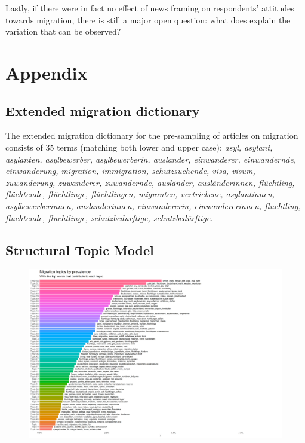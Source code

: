 \documentclass{article}
\begin{document}
Lastly, if there were in fact no effect of news framing on respondents' attitudes towards migration, there is still a major open question: what does explain the variation that can be observed?

\newpage

\section{Appendix}

\subsection{Extended migration dictionary}\label{app:dictionary}

The extended migration dictionary for the pre-sampling of articles on migration consists of 35 terms (matching both lower and upper case): \textit{asyl, asylant, asylanten, asylbewerber, asylbewerberin, auslander, einwanderer, einwandernde, einwanderung, migration, immigration, schutzsuchende, visa, visum, zuwanderung, zuwanderer, zuwandernde, ausländer, ausländerinnen, flüchtling, flüchtende, flüchtlinge, flüchtlingen, migranten, vertriebene, asylantinnen, asylbewerberinnen, auslanderinnen, einwandererin, einwandererinnen, fluchtling, fluchtende, fluchtlinge, schutzbedurftige, schutzbedürftige.}

\newpage

\subsection{Structural Topic Model}\label{app:stm}

\begin{figure}[!ht]
    \centering
    \includegraphics[width=2\textwidth]{paper/vis/mig_topics_plot.png}
    \label{fig:topics}
\end{figure}
\end{document}
